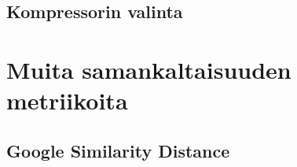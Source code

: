 \documentclass[11pt,finnish]{tktltiki2}
\theoremstyle{definition}
\theoremstyle{remark}
\begin{document}

  \subsection{Kompressorin valinta} %
  \label{sub:kompressorin_valinta}

    \iffalse
      This paper shows that the compressors used to compute the normalized compression distance are not idempotent in some cases, being strongly skewed with the size of the objects and window size, and therefore causing a deviation in the identity property of the distance if we don’t take care that the objects to be compressed fit the windows. The relationship underlying the precision of the distance and the size of the objects has been analyzed for several well-known compressors, and specially in depth for three cases, bzip2, gzip and PPMZ which are examples of the three main types of compressors: block-sorting, Lempel-Ziv, and statistic.
    \fi

\section{Muita samankaltaisuuden metriikoita} %
\label{sec:muita_samankaltaisuuden_metriikoita}
  \subsection{Google Similarity Distance} %
  \label{sub:google_similarity_distance}

%
%

%

% 





%
\end{document}
